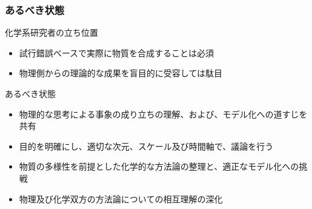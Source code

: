 \documentclass[12pt, dvipdfmx]{beamer}
\begin{document}
\begin{frame}
    \frametitle{あるべき状態}
    \begin{exampleblock}{化学系研究者の立ち位置}
        \begin{itemize}
            \item 試行錯誤ベースで実際に物質を合成することは必須
            \item 物理側からの理論的な成果を盲目的に受容しては駄目
        \end{itemize}
    \end{exampleblock}
    \begin{alertblock}{あるべき状態}
        \begin{itemize}
            \item 物理的な思考による事象の成り立ちの理解、および、モデル化への道すじを共有
            \item 目的を明確にし、適切な次元、スケール及び時間軸で、議論を行う
            \item 物質の多様性を前提とした化学的な方法論の整理と、適正なモデル化への挑戦
            \item 物理及び化学双方の方法論についての相互理解の深化
        \end{itemize}
    \end{alertblock}
\end{frame}
\end{document}
